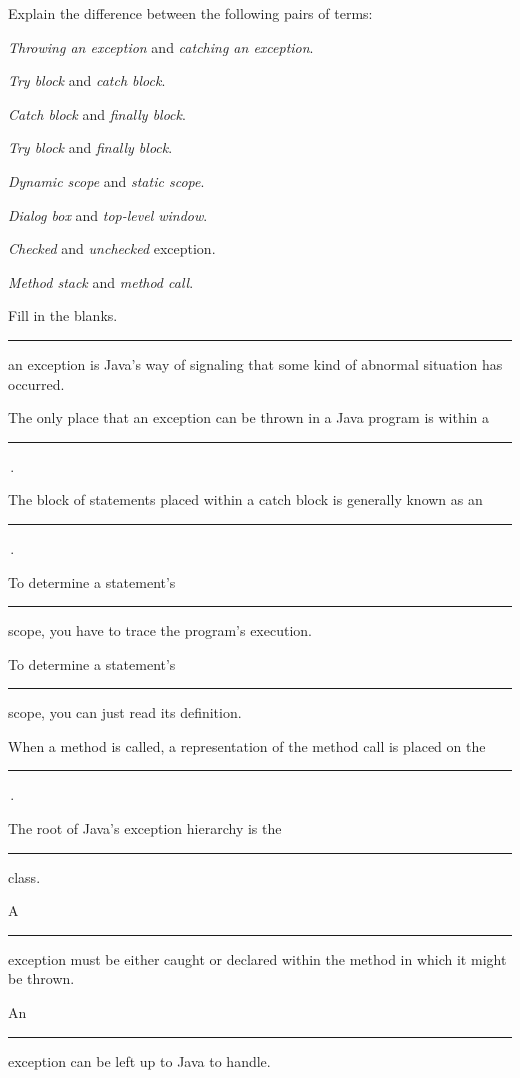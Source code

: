 \label{exercises}
\begin{EXRtwo}
\item  Explain the difference between the following pairs of terms:
\begin{EXRtwoLL}
\item  {\it Throwing an exception} and {\it catching an exception}.
\item  {\it Try block} and {\it catch block}.
\item  {\it Catch block} and {\it finally block}.
\item  {\it Try block} and {\it finally block}.
\item  {\it Dynamic scope} and {\it static scope}.
\item  {\it Dialog box} and {\it top-level window}.
\item  {\it Checked} and {\it unchecked} exception.
\item  {\it Method stack} and {\it method call}.
\end{EXRtwoLL}

\item  Fill in the blanks.
\begin{EXRtwoLL}\baselineskip=14pt
\item  \rule{40pt}{0.5pt} an exception is Java's way of signaling
that some kind of abnormal situation has occurred.
\item  The only place that an exception can be thrown in
a Java program is within a \rule{40pt}{0.5pt}\,.
\item  The block of statements placed within a catch block is generally
known as an  \rule{40pt}{0.5pt}\,.
\item  To determine a statement's \rule{40pt}{0.5pt} scope, you have to trace
the program's execution.
\item  To determine a statement's \rule{40pt}{0.5pt} scope, you can just
read its definition.
\item  When a method is called, a representation of the method
call is placed on the \rule{40pt}{0.5pt}\,.
\item  The root of Java's exception hierarchy is
the \rule{40pt}{0.5pt} class.
\item  A  \rule{40pt}{0.5pt} exception must be either caught or declared
within the method in which it might be thrown.
\nopagebreak[4]\item  An \rule{40pt}{0.5pt} exception can be left up to Java to handle.
\end{EXRtwoLL}\baselineskip=11pt


\end{EXRtwo}
